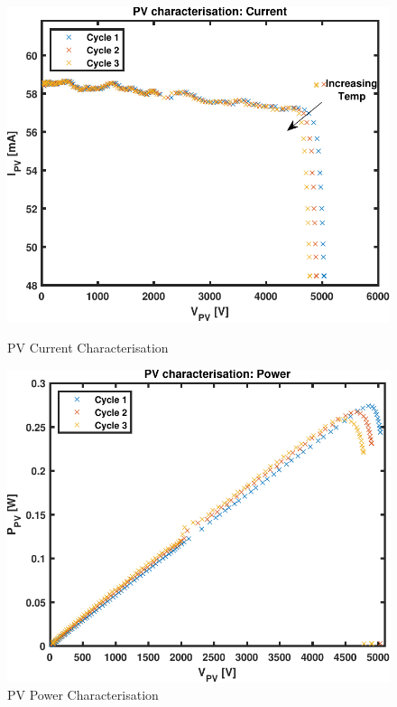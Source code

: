 \documentclass[10pt,twoside]{article}
\begin{document}
\begin{figure}[hbt!]
  \begin{minipage}[b]{0.46\textwidth}
    \centering
    \includegraphics[width=\textwidth]{PVvoltage.pdf}
    \caption{PV Current Characterisation}
    \label{fig:PVvoltage}
  \end{minipage}
  \hspace{0.7cm}
  \begin{minipage}[b]{0.46\textwidth}
    \includegraphics[width=\textwidth]{PVpower.pdf}
    \caption{PV Power Characterisation}
    \label{fig:PVpower}
  \end{minipage}
\end{figure}
\end{document}

